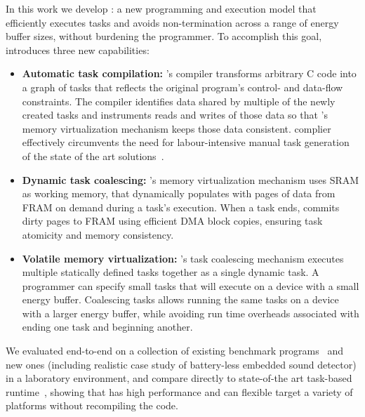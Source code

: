  In this work we develop {\bf \sys}: a new programming and execution model that efficiently executes tasks and avoids non-termination across a range of energy buffer sizes, without burdening the programmer. To accomplish this goal, \sys introduces three new capabilities: 

\begin{itemize}
	\item {\bf Automatic task compilation:} \sys's compiler transforms arbitrary C code into a graph of tasks that reflects the original program's control- and data-flow constraints. The compiler identifies data shared by multiple of the newly created tasks and instruments reads and writes of those data so that \sys's memory virtualization mechanism keeps those data consistent. \sys complier effectively circumvents the need for labour-intensive manual task generation of the state of the art solutions~\cite{chain,alpaca}. 
	\item {\bf Dynamic task coalescing:} \sys's memory virtualization mechanism uses SRAM as working memory, that \sys dynamically populates with pages of data from FRAM on demand during a task's execution. When a task ends, \sys commits dirty pages to FRAM using efficient DMA block copies, ensuring task atomicity and memory consistency. 
	\item {\bf Volatile memory virtualization:} \sys's task coalescing mechanism executes multiple statically defined tasks together as a single dynamic task. A programmer can specify small tasks that will execute on a device with a small energy buffer. Coalescing tasks allows running the same tasks on a device with a larger energy buffer, while avoiding run time overheads associated with ending one task and beginning another.
\end{itemize}

We evaluated \sys end-to-end on a collection of existing benchmark programs~\cite[Sec. 5]{chain} and new ones (including realistic case study of battery-less embedded sound detector) in a laboratory environment, and compare directly to state-of-the art task-based runtime~\cite{chain}, showing that \sys has high performance and can flexible target a variety of platforms without recompiling the code. 

